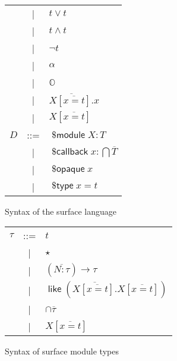 \documentclass[a4paper,10pt]{article}
\DeclareMathOperator{\kwopq}{\textsf{\$opaque}}
\DeclareMathOperator{\kwtp}{\textsf{\$type}}
\DeclareMathOperator{\kwmdl}{\textsf{\$module}}
\DeclareMathOperator{\kwclbk}{\textsf{\$callback}}
\DeclareMathOperator{\kwlike}{\textsf{like}}
\begin{document}
\begin{figure}
\begin{tabular}{r c l}
    & | & $t\vee t$ \\
    & | & $t\wedge t$ \\
    & | & $\neg t$\\
    & | & $\alpha$ \\
    & | & $\mathbb{O}$ \\
    & | & {\color{red}$\overline{X\left[\overline{x=t}\right].}x$} \\
    & | & {\color{red}$X\left[\overline{x=t}\right]$} \\
    $D$ & ::= & $\kwmdl X : T$ \\
    & | & $\kwclbk x : \bigcap \overline{T}$ \\
    & | & $\kwopq x$ \\
    & | & $\kwtp x = t$
  \end{tabular}
  \caption{Syntax of the surface language}
\end{figure}
\begin{figure}
  \begin{tabular}{r c l}
    $\tau$ & ::= & $t$ \\
    & | & $\star$ \\
    & | & $\left(\overline{N:\tau}\right)\rightarrow \tau$ \\
    & | & $\kwlike\left(\overline{X\left[\overline{x=t}\right].}X\left[\overline{x=t}\right]\right)$ \\
    & | & $\cap\overline{\tau}$\\
    & | & $X\left[\overline{x=t}\right]$
  \end{tabular}
  \caption{Syntax of surface module types}
\end{figure}
\end{document}
